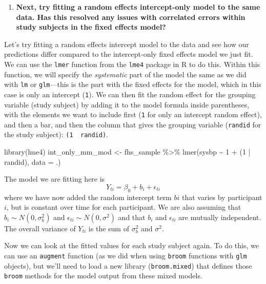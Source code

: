 \documentclass[
]{book}
\newenvironment{Shaded}{\begin{snugshade}}{\end{snugshade}}
\newcommand{\AttributeTok}[1]{\textcolor[rgb]{0.77,0.63,0.00}{#1}}
\newcommand{\DecValTok}[1]{\textcolor[rgb]{0.00,0.00,0.81}{#1}}
\newcommand{\FunctionTok}[1]{\textcolor[rgb]{0.00,0.00,0.00}{#1}}
\newcommand{\NormalTok}[1]{#1}
\newcommand{\OtherTok}[1]{\textcolor[rgb]{0.56,0.35,0.01}{#1}}
\newcommand{\SpecialCharTok}[1]{\textcolor[rgb]{0.00,0.00,0.00}{#1}}
\providecommand{\tightlist}{%
  \setlength{\itemsep}{0pt}\setlength{\parskip}{0pt}}
\begin{document}
\begin{enumerate}
\def\labelenumi{\arabic{enumi}.}
\setcounter{enumi}{1}
\tightlist
\item
  \textbf{Next, try fitting a random effects intercept-only model to the same data. Has this resolved any issues with correlated errors within study subjects in the fixed effects model?}
\end{enumerate}

Let's try fitting a random effects intercept model to the data and see how our
predictions differ compared to the intercept-only fixed effects model we just fit.
We can use the \texttt{lmer} function from the \texttt{lme4} package in R to do this. Within
this function, we will specify the \emph{systematic} part of the model the same as
we did with \texttt{lm} or \texttt{glm}---this is the part with the fixed effects for the model,
which in this case is only an intercept (\texttt{1}). We can then fit the random
effect for the grouping variable (study subject) by adding it to the model formula
inside parentheses, with the elements we want to include first (\texttt{1} for only
an intercept random effect), and then a bar, and then the column that gives
the grouping variable (\texttt{randid} for the study subject): \texttt{(1\ \textbar{}\ randid)}.

\begin{Shaded}
\begin{Highlighting}[]
\FunctionTok{library}\NormalTok{(lme4)}
\NormalTok{int\_only\_mm\_mod }\OtherTok{\textless{}{-}}\NormalTok{ fhs\_sample }\SpecialCharTok{\%\textgreater{}\%} 
  \FunctionTok{lmer}\NormalTok{(sysbp }\SpecialCharTok{\textasciitilde{}} \DecValTok{1} \SpecialCharTok{+}\NormalTok{ (}\DecValTok{1} \SpecialCharTok{|}\NormalTok{ randid), }\AttributeTok{data =}\NormalTok{ .) }
\end{Highlighting}
\end{Shaded}

The model we are fitting here is
\[
Y_{ti} = \beta_{0} + b_{i} + \epsilon_{ti}
\]
where we have now added the random intercept term \(b{i}\) that varies by participant
\(i\), but is constant over time for each participant. We are also assuming that
\(b_{i} \sim N(0,\sigma_{b}^2)\) and \(\epsilon_{ti} \sim N(0,\sigma^2)\) and that \(b_{i}\)
and \(\epsilon_{ti}\) are mutually independent. The overall variance of \(Y_{ti}\) is
the sum of \(\sigma_{b}^2\) and \(\sigma^2\).

Now we can look at the fitted values for each study subject again. To do this,
we can use an \texttt{augment} function (as we did when using \texttt{broom} functions with
\texttt{glm} objects), but we'll need to load a new library (\texttt{broom.mixed}) that defines
those \texttt{broom} methods for the model output from these mixed models.
\end{document}
